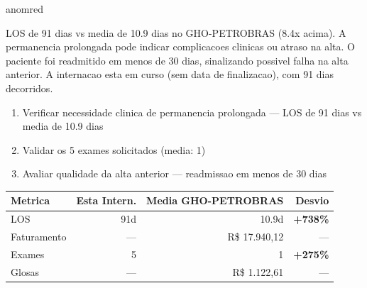 \documentclass[a4paper,10pt]{article}
\begin{document}
\begin{anomalycard}[Internacao 159824 | GHO-PETROBRAS | CRITICO (z=5.64)]{anomred}
\vspace{2pt}\begin{tcolorbox}[colback=severityred!20,colframe=anomred,title={\textbf{Interpretacao de Negocio}},fonttitle=\bfseries\small,left=4pt,right=4pt,top=3pt,bottom=3pt]
{\small LOS de 91 dias vs media de 10.9 dias no GHO-PETROBRAS (8.4x acima). A permanencia prolongada pode indicar complicacoes clinicas ou atraso na alta. O paciente foi readmitido em menos de 30 dias, sinalizando possivel falha na alta anterior. A internacao esta em curso (sem data de finalizacao), com 91 dias decorridos.}
\end{tcolorbox}
\begin{tcolorbox}[colback=severityyellow!30,colframe=anomorange,title={\textbf{Recomendacoes Especificas}},fonttitle=\bfseries\small,left=4pt,right=4pt,top=3pt,bottom=3pt]
\begin{enumerate}[nosep,leftmargin=16pt]
\item {\small Verificar necessidade clinica de permanencia prolongada --- LOS de 91 dias vs media de 10.9 dias}
\item {\small Validar os 5 exames solicitados (media: 1)}
\item {\small Avaliar qualidade da alta anterior --- readmissao em menos de 30 dias}
\end{enumerate}
\end{tcolorbox}
\begin{center}\begin{tabular}{l r r r}\toprule\textbf{Metrica} & \textbf{Esta Intern.} & \textbf{Media GHO-PETROBRAS} & \textbf{Desvio} \\\midrule
LOS & 91d & 10.9d & \textcolor{anomred}{\textbf{+738\%}} \\
Faturamento & --- & R\$ 17.940,12 & --- \\
Exames & 5 & 1 & \textcolor{anomred}{\textbf{+275\%}} \\
Glosas & --- & R\$ 1.122,61 & --- \\
\bottomrule\end{tabular}\end{center}


\end{anomalycard}
\end{document}
